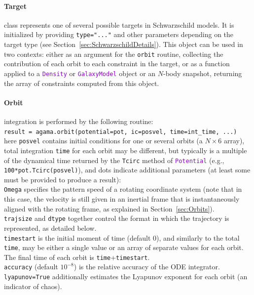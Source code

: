 \documentclass[12pt]{article}
\newcommand{\ttt}[1]{\textcolor{darkviolet}{\texttt{#1}}}
\newcommand{\ppp}[1]{\textcolor{darkolive} {\texttt{#1}}}
\begin{document}
\paragraph{Target} class represents one of several possible targets in Schwarzschild models. It is initialized by providing \ppp{type="..."} and other parameters depending on the target type (see Section~\ref{sec:SchwarzschildDetails}). This object can be used in two contexts: either as an argument for the \texttt{orbit} routine, collecting the contribution of each orbit to each constraint in the target, or as a function applied to a \ttt{Density} or \ttt{GalaxyModel} object or an $N$-body snapshot, returning the array of constraints computed from this object.

\paragraph{Orbit} integration is performed by the following routine:\\
\texttt{result = agama.orbit(potential=pot, ic=posvel, time=int_time, ...)}\\
here \ppp{posvel} contains initial conditions for one or several orbits (a $N\times6$ array), total integration \ppp{time} for each orbit may be different, but typically is a multiple of the dynamical time returned by the \texttt{Tcirc} method of \ttt{Potential} (e.g., \texttt{100*pot.Tcirc(posvel)}), and dots indicate additional parameters (at least some must be provided to produce a result):\\
\ppp{Omega} specifies the pattern speed of a rotating coordinate system (note that in this case, the velocity is still given in an inertial frame that is instantaneously aligned with the rotating frame, as explained in Section~\ref{sec:Orbits}).\\
\ppp{trajsize} and \ppp{dtype} together control the format in which the trajectory is represented, as detailed below.\\
\ppp{timestart} is the initial moment of time (default 0), and similarly to the total \texttt{time}, may be either a single value or an array of separate values for each orbit. The final time of each orbit is \texttt{time}+\texttt{timestart}.\\
\ppp{accuracy} (default $10^{-8}$) is the relative accuracy of the ODE integrator.\\
\ppp{lyapunov}\texttt{=True} additionally estimates the Lyapunov exponent for each orbit (an indicator of chaos).\\
\end{document}
